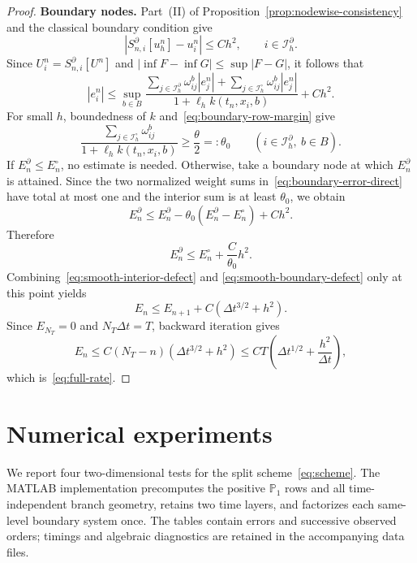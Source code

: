 \documentclass[10pt,a4paper]{amsart}
\newcommand{\dt}{\Delta t}
\begin{document}
\begin{proof}
		\medskip
		\noindent\textbf{Boundary nodes.}
		Part~\textup{(II)} of Proposition~\ref{prop:nodewise-consistency} and the
		classical boundary condition give
		\begin{equation}
			\left|S_{n,i}^{\partial}[u_h^n]-u_i^n\right|\le Ch^2,
			\qquad i\in\mathcal I_h^\partial.
			\label{eq:boundary-exact-defect}
		\end{equation}
		Since $U_i^n=S_{n,i}^{\partial}[U^n]$ and
		$|\inf F-\inf G|\le\sup|F-G|$, it follows that
		\begin{equation}
			|e_i^n|\le
			\sup_{b\in B}
			\frac{\displaystyle\sum_{j\in\mathcal I_h^\partial}
				\omega_{ij}^b|e_j^n|
				+\displaystyle\sum_{j\in\mathcal I_h^\circ}
				\omega_{ij}^b|e_j^n|}
			{1+\ell_hk(t_n,x_i,b)}+Ch^2.
			\label{eq:boundary-error-direct}
		\end{equation}
		For small $h$, boundedness of $k$ and~\eqref{eq:boundary-row-margin} give
		\[
		\frac{\sum_{j\in\mathcal I_h^\circ}\omega_{ij}^b}
		{1+\ell_hk(t_n,x_i,b)}\ge\frac\theta2=: \theta_0
		\qquad(i\in\mathcal I_h^\partial,\ b\in B).
		\]
		If $E_n^\partial\le E_n^\circ$, no estimate is needed.  Otherwise, take a
		boundary node at which $E_n^\partial$ is attained.  Since the two normalized
		weight sums in~\eqref{eq:boundary-error-direct} have total at most one and
		the interior sum is at least $\theta_0$, we obtain
		\[
		E_n^\partial
		\le E_n^\partial-\theta_0(E_n^\partial-E_n^\circ)+Ch^2.
		\]
		Therefore
		\begin{equation}
			E_n^\partial\le E_n^\circ+\frac{C}{\theta_0}h^2.
			\label{eq:smooth-boundary-defect}
		\end{equation}
		Combining~\eqref{eq:smooth-interior-defect} and
		\eqref{eq:smooth-boundary-defect} only at this point yields
		\[
		E_n\le E_{n+1}+C(\dt^{3/2}+h^2).
		\]
		Since $E_{N_T}=0$ and $N_T\dt=T$, backward iteration gives
		\[
		E_n\le C(N_T-n)(\dt^{3/2}+h^2)
		\le CT\left(\dt^{1/2}+\frac{h^2}{\dt}\right),
		\]
		which is~\eqref{eq:full-rate}.
	\end{proof}

\section{Numerical experiments}
\label{sec:numerics}

We report four two-dimensional tests for the split scheme~\eqref{eq:scheme}.
The MATLAB implementation precomputes the positive $\mathbb P_1$ rows and all
time-independent branch geometry, retains two time layers, and factorizes each
same-level boundary system once.  The tables contain errors and successive
observed orders; timings and algebraic diagnostics are retained in the
accompanying data files.
\end{document}
